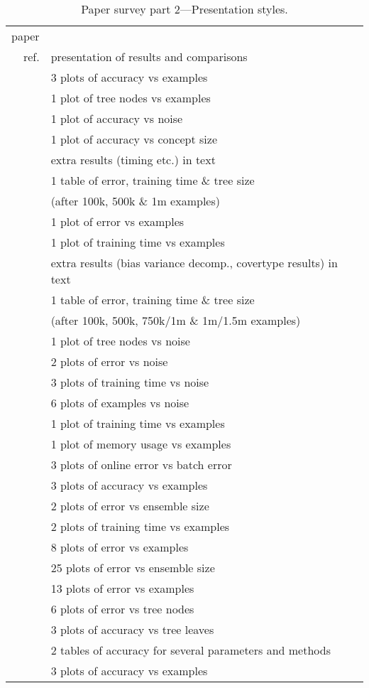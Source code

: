 \begin{table}
\caption{Paper survey part 2---Presentation styles.}
\centering
\footnotesize
\begin{tabular}{|r|l|}
\hline			
paper	&		\\
ref.	& presentation of results and comparisons		\\
\hline			
\cite{vfdt}	&	3 plots of accuracy vs examples	\\
	&	1 plot of tree nodes vs examples	\\
	&	1 plot of accuracy vs noise	\\
	&	1 plot of accuracy vs concept size	\\
	&	extra results (timing etc.) in text	\\
\hline			
\cite{vfdtc}	&	1 table of error, training time \& tree size \\
	& (after 100k, 500k \& 1m examples)	\\
	&	1 plot of error vs examples	\\
	&	1 plot of training time vs examples	\\
	&	extra results (bias variance decomp., covertype results) in text	\\
\hline			
\cite{ufft}	&	1 table of error, training time \& tree size \\
	& (after 100k, 500k, 750k/1m \& 1m/1.5m examples)	\\
\hline			
\cite{nip}	&	1 plot of tree nodes vs noise	\\
	&	2 plots of error vs noise	\\
	&	3 plots of training time vs noise	\\
	&	6 plots of examples vs noise	\\
	&	1 plot of training time vs examples	\\
	&	1 plot of memory usage vs examples	\\
\hline			
\cite{ozaexp}	&	3 plots of online error vs batch error	\\
	&	3 plots of accuracy vs examples	\\
	&	2 plots of error vs ensemble size	\\
	&	2 plots of training time vs examples	\\
\hline			
\cite{sea}	&	8 plots of error vs examples	\\
\hline			
\cite{branchpred}	&	25 plots of error vs ensemble size	\\
	&	13 plots of error vs examples	\\
	&	6 plots of error vs tree nodes	\\
\hline			
\cite{fastlightboost}	&	3 plots of accuracy vs tree leaves	\\
	&	2 tables of accuracy for several parameters and methods	\\
	&	3 plots of accuracy vs examples	\\
\hline													
\end{tabular}
\label{tab:evalsurvey2}
\end{table}

